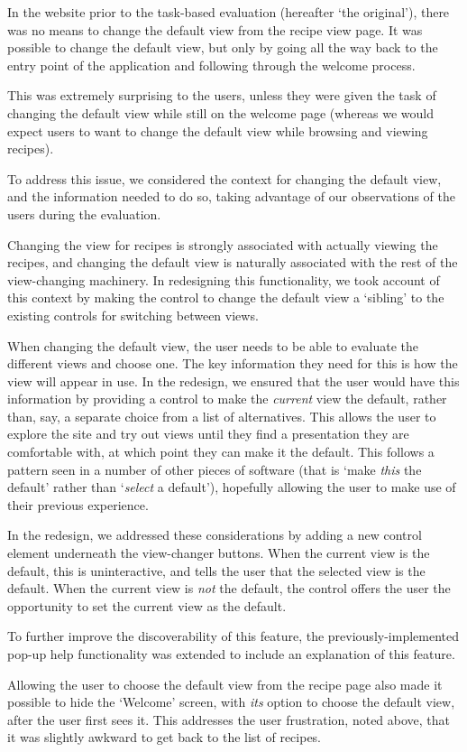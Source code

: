 In the website prior to the task-based evaluation (hereafter `the
original'), there was no means to change the default view from the
recipe view page. It was possible to change the
default view, but only by going all the way back to the entry point of
the application and following through the welcome
process.

This was extremely surprising to the users, unless they were given the
task of changing the default view while still on the welcome page
(whereas we would expect users to want to change the default view
while browsing and viewing recipes).

To address this issue, we considered the context for changing the
default view, and the information needed to do so, taking advantage of
our observations of the users during the evaluation.

Changing the view for recipes is strongly associated with actually
viewing the recipes, and changing the default view is naturally
associated with the rest of the view-changing machinery. In
redesigning this functionality, we took account of this context by
making the control to change the default view a `sibling' to the
existing controls for switching between views.

When changing the default view, the user needs to be able to evaluate
the different views and choose one. The key information they need for
this is how the view will appear in use. In the redesign, we ensured
that the user would have this information by providing a control to
make the \emph{current} view the default, rather than, say, a separate
choice from a list of alternatives. This allows the user to explore
the site and try out views until they find a presentation they are
comfortable with, at which point they can make it the default. This
follows a pattern seen in a number of other pieces of software (that
is `make \emph{this} the default' rather than `\emph{select} a
default'), hopefully allowing the user to make use of their previous
experience.

In the redesign, we addressed these considerations by adding a new
control element underneath the view-changer buttons. When the current
view is the default, this is uninteractive, and tells the user that
the selected view is the default. When the current
view is \emph{not} the default, the control offers the user the
opportunity to set the current view as the default.

To further improve the discoverability of this feature, the
previously-implemented pop-up help functionality was extended to
include an explanation of this feature.

Allowing the user to choose the default view from the recipe page also
made it possible to hide the `Welcome' screen, with \emph{its} option
to choose the default view, after the user first sees it. This
addresses the user frustration, noted above, that it was slightly
awkward to get back to the list of recipes.
